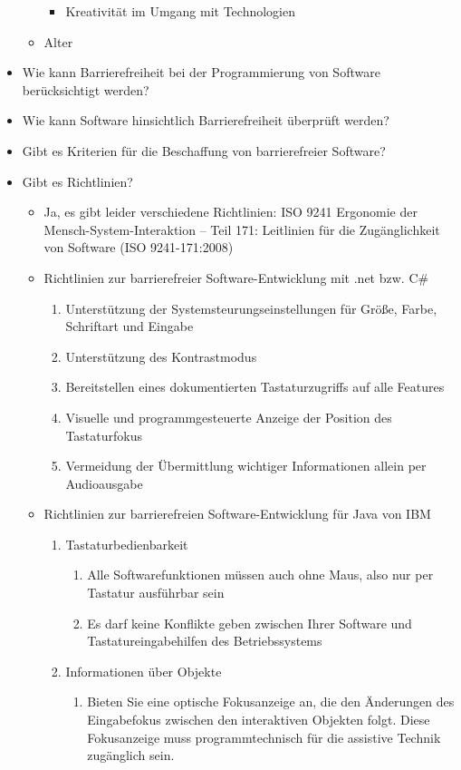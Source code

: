 \documentclass[paper=a4, fontsize=11pt]{scrartcl} %
\numberwithin{equation}{section} %
\numberwithin{figure}{section} %
\numberwithin{table}{section} %
\begin{document}
\begin{itemize}
\begin{itemize}
\begin{itemize}
\item Kreativität im Umgang mit Technologien
\end{itemize}
\item Alter
\end{itemize}
\item Wie kann Barrierefreiheit bei der Programmierung von Software berücksichtigt werden?
\item Wie kann Software hinsichtlich Barrierefreiheit überprüft werden?
\item Gibt es Kriterien für die Beschaffung von barrierefreier Software?
\item Gibt es Richtlinien?
\begin{itemize}
\item Ja, es gibt leider verschiedene Richtlinien: ISO 9241 Ergonomie der Mensch-System-Interaktion – Teil 171: Leitlinien für die Zugänglichkeit von Software (ISO 9241-171:2008)
\item Richtlinien zur barrierefreier Software-Entwicklung mit .net bzw. C\#
\begin{enumerate}
\item Unterstützung der Systemsteurungseinstellungen für Größe, Farbe, Schriftart und Eingabe
\item Unterstützung des Kontrastmodus
\item Bereitstellen eines dokumentierten Tastaturzugriffs auf alle Features
\item Visuelle und programmgesteuerte Anzeige der Position des Tastaturfokus
\item Vermeidung der Übermittlung wichtiger Informationen allein per Audioausgabe
\end{enumerate}
\item Richtlinien zur barrierefreien Software-Entwicklung für Java von IBM
\begin{enumerate}[label*=\arabic*.]
\item Tastaturbedienbarkeit
\begin{enumerate}[label*=\arabic*.]
\item Alle Softwarefunktionen müssen auch ohne Maus, also nur per Tastatur ausführbar sein
\item Es darf keine Konflikte geben zwischen Ihrer Software und Tastatureingabehilfen des Betriebssystems
\end{enumerate}
\item Informationen über Objekte
\begin{enumerate}[label*=\arabic*.]
\item Bieten Sie eine optische Fokusanzeige an, die den Änderungen des Eingabefokus zwischen den interaktiven Objekten folgt. Diese Fokusanzeige muss programmtechnisch für die assistive Technik zugänglich sein.

\end{enumerate}
\end{enumerate}
\end{itemize}
\end{itemize}
\end{document}
